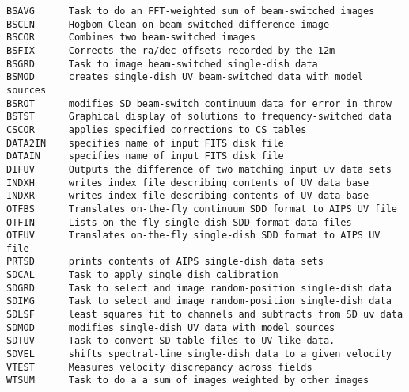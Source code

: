 \vskip 0.5pt
\bbve\begin{verbatim}
BSAVG      Task to do an FFT-weighted sum of beam-switched images
BSCLN      Hogbom Clean on beam-switched difference image
BSCOR      Combines two beam-switched images
BSFIX      Corrects the ra/dec offsets recorded by the 12m
BSGRD      Task to image beam-switched single-dish data
BSMOD      creates single-dish UV beam-switched data with model sources
BSROT      modifies SD beam-switch continuum data for error in throw
BSTST      Graphical display of solutions to frequency-switched data
CSCOR      applies specified corrections to CS tables
DATA2IN    specifies name of input FITS disk file
DATAIN     specifies name of input FITS disk file
DIFUV      Outputs the difference of two matching input uv data sets
INDXH      writes index file describing contents of UV data base
INDXR      writes index file describing contents of UV data base
OTFBS      Translates on-the-fly continuum SDD format to AIPS UV file
OTFIN      Lists on-the-fly single-dish SDD format data files
OTFUV      Translates on-the-fly single-dish SDD format to AIPS UV file
PRTSD      prints contents of AIPS single-dish data sets
SDCAL      Task to apply single dish calibration
SDGRD      Task to select and image random-position single-dish data
SDIMG      Task to select and image random-position single-dish data
SDLSF      least squares fit to channels and subtracts from SD uv data
SDMOD      modifies single-dish UV data with model sources
SDTUV      Task to convert SD table files to UV like data.
SDVEL      shifts spectral-line single-dish data to a given velocity
VTEST      Measures velocity discrepancy across fields
WTSUM      Task to do a a sum of images weighted by other images
\end{verbatim}\eve


